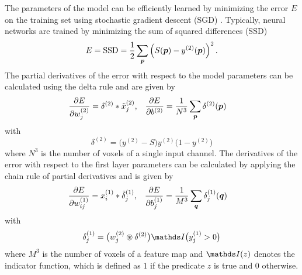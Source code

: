 The parameters of the model can be efficiently learned by minimizing the error
$E$ on the training set using stochastic gradient descent (SGD)
\cite{LeCun1998}. Typically, neural networks are trained by minimizing the sum
of squared differences (SSD)
\begin{equation}
E = \text{SSD} = \frac{1}{2}\sum_{\vect{p}}\left(S(\vect{p}) -
y^{(2)}(\vect{p})\right)^2.
\end{equation}
The partial derivatives of the error with respect to the model parameters can be
calculated using the delta rule and are given by
\begin{align}
\frac{\partial E}{\partial w^{(2)}_j} &= \delta^{(2)} * \tilde{x}^{(2)}_j
\text{,} &
\frac{\partial E}{\partial b^{(2)}} &= \frac{1}{N^3}\sum_{\vect{p}}
\delta^{(2)}(\vect{p})
\label{eq:dE2}
\end{align}
with 
\begin{equation}
\delta^{(2)} = \big(y^{(2)} -S\big)y^{(2)}\big(1-y^{(2)}\big)
\label{eq:delta2}
\end{equation}
where $N^3$ is the number of voxels of a single input channel. The derivatives
of the error with respect to the first layer parameters can be calculated by
applying the chain rule of partial derivatives and is given by
\begin{align}
\frac{\partial E}{\partial w^{(1)}_{ij}} &= x^{(1)}_i * \tilde{\delta}^{(1)}_j,
&
\frac{\partial E}{\partial b^{(1)}_j} &= \frac{1}{M^3}\sum_{\vect{q}}
\delta^{(1)}_j(\vect{q})
\label{eq:dE1}
\end{align}
with
\begin{equation}
\delta^{(1)}_j = \big(w^{(2)}_{j}\circledast\delta^{(2)}\big)\I\big(y^{(1)}_j >
0\big)
\label{eq:delta1}
\end{equation}
where $M^3$ is the number of voxels of a feature map and $\I(z)$ denotes the
indicator function, which is defined as $1$ if the predicate $z$ is true and
$0$ otherwise.

